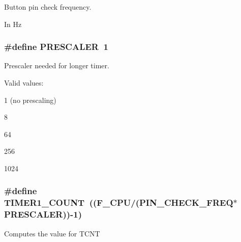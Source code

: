 Button pin check frequency. 

In Hz \hypertarget{group__timer_defs_ga0fac869d83ac1a584d6c45cf609f5fe7}{
\subsubsection[{P\-R\-E\-S\-C\-A\-L\-E\-R}]{\setlength{\rightskip}{0pt plus 5cm}\#define {\bf P\-R\-E\-S\-C\-A\-L\-E\-R}~1}}\label{group__timer_defs_ga0fac869d83ac1a584d6c45cf609f5fe7}


Prescaler needed for longer timer. 

Valid values\-:
\begin{DoxyItemize}
\item 1 (no prescaling)
\item 8
\item 64
\item 256
\item 1024 
\end{DoxyItemize}\hypertarget{group__timer_defs_gafa3acf3a16f5e22815253e1cd4f25dca}{
\subsubsection[{T\-I\-M\-E\-R1\-\_\-\-C\-O\-U\-N\-T}]{\setlength{\rightskip}{0pt plus 5cm}\#define {\bf T\-I\-M\-E\-R1\-\_\-\-C\-O\-U\-N\-T}~((F\-\_\-\-C\-P\-U/({\bf P\-I\-N\-\_\-\-C\-H\-E\-C\-K\-\_\-\-F\-R\-E\-Q}$\ast${\bf P\-R\-E\-S\-C\-A\-L\-E\-R}))-\/1)}}\label{group__timer_defs_gafa3acf3a16f5e22815253e1cd4f25dca}
Computes the value for T\-C\-N\-T 
